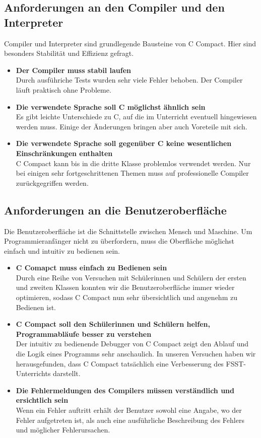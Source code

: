\subsection*{Anforderungen an den Compiler und den Interpreter}
Compiler und Interpreter sind grundlegende Bausteine von C Compact. Hier sind besonders Stabilität und Effizienz gefragt.
\begin{itemize}
\item \textbf{Der Compiler muss stabil laufen}\\
Durch ausführiche Tests wurden sehr viele Fehler behoben. Der Compiler läuft praktisch ohne Probleme.
\item \textbf{Die verwendete Sprache soll C möglichst ähnlich sein}\\
Es gibt leichte Unterschiede zu C, auf die im Unterricht eventuell hingewiesen werden muss. Einige der Änderungen bringen aber auch Voreteile mit sich.
\item \textbf{Die verwendete Sprache soll gegenüber C keine wesentlichen Einschränkungen enthalten}\\
C Compact kann bis in die dritte Klasse problemlos verwendet werden. Nur bei einigen sehr fortgeschrittenen Themen muss auf professionelle Compiler zurückgegriffen werden.
\end{itemize}

\subsection*{Anforderungen an die Benutzeroberfläche}
Die Benutzeroberfläche ist die Schnittstelle zwischen Mensch und Maschine. Um Programmieranfänger nicht zu überfordern, muss die Oberfläche möglichst einfach und intuitiv zu bedienen sein.
\begin{itemize}
\item \textbf{C Comapct muss einfach zu Bedienen sein}\\
Durch eine Reihe von Versuchen mit Schülerinnen und Schülern der ersten und zweiten Klassen konnten wir die Benutzeroberfläche immer wieder optimieren, sodass C Compact nun sehr übersichtlich und angenehm zu Bedienen ist.
\item \textbf{C Compact soll den Schülerinnen und Schülern helfen, Programmabläufe besser zu verstehen}\\
Der intuitiv zu bedienende Debugger von C Compact zeigt den Ablauf und die Logik eines Programms sehr anschaulich. In unseren Versuchen haben wir herausgefunden, dass C Compact tatsächlich eine Verbesserung des FSST-Unterrichts darstellt.
\item \textbf{Die Fehlermeldungen des Compilers müssen verständlich und ersichtlich sein}\\
Wenn ein Fehler auftritt erhält der Benutzer sowohl eine Angabe, wo der Fehler aufgetreten ist, als auch eine ausführliche Beschreibung des Fehlers und möglicher Fehlerursachen.
\end{itemize}

